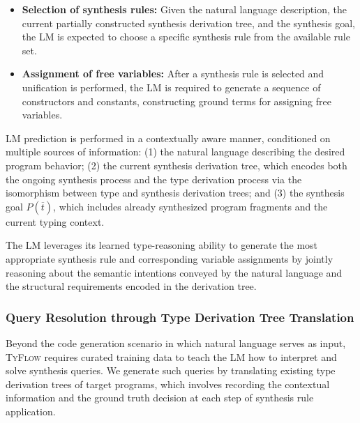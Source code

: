 \documentclass[manuscript,screen]{acmart}
\newcommand{\toolname}[1]{\textsc{#1}}
\newcommand{\mainname}{\toolname{TyFlow}\xspace}
\begin{document}
\begin{itemize}
  \item \textbf{Selection of synthesis rules:} Given the natural language description, the current partially constructed synthesis derivation tree, and the synthesis goal, the LM is expected to choose a specific synthesis rule from the available rule set.

  \item \textbf{Assignment of free variables:} After a synthesis rule is selected and unification is performed, the LM is required to generate a sequence of constructors and constants, constructing ground terms for assigning free variables. 
\end{itemize}

LM prediction is performed in a contextually aware manner, conditioned on multiple sources of information: (1) the natural language describing the desired program behavior; (2) the current synthesis derivation tree, which encodes both the ongoing synthesis process and the type derivation process via the isomorphism between type and synthesis derivation trees; and (3) the synthesis goal $P(\overline{t})$, which includes already synthesized program fragments and the current typing context.

The LM leverages its learned type-reasoning ability to generate the most appropriate synthesis rule and corresponding variable assignments by jointly reasoning about the semantic intentions conveyed by the natural language and the structural requirements encoded in the derivation tree. 

\subsubsection{Query Resolution through Type Derivation Tree Translation}
\label{sec:translation}
Beyond the code generation scenario in which natural language serves as input, \mainname requires curated training data to teach the LM how to interpret and solve synthesis queries. 
We generate such queries by translating existing type derivation trees of target programs, which involves recording the contextual information and the ground truth decision at each step of synthesis rule application.
\end{document}
